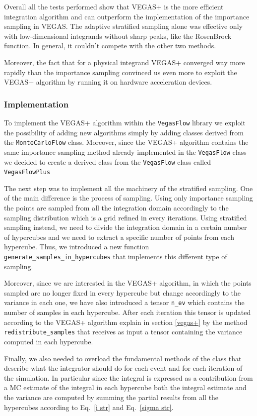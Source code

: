 \documentclass[../main/main.tex]{subfiles}
\begin{document}
Overall all the tests performed show that VEGAS+ is  the more efficient integration algorithm and can outperform the implementation of the importance sampling in VEGAS. The adaptive stratified sampling alone was effective only with low-dimensional integrands without sharp peaks, like the RosenBrock function. In general, it couldn't compete with the other two methods.

Moreover, the fact that for a physical integrand VEGAS+ converged way more rapidly than the importance sampling convinced us even more to exploit the VEGAS+ algorithm by running it on hardware acceleration devices.


\subsubsection{Implementation}
To implement the VEGAS+ algorithm within the \texttt{VegasFlow} library we exploit the possibility of adding new algorithms simply by
adding classes derived from the \texttt{MonteCarloFlow} class. Moreover, since the VEGAS+ algorithm contains the same importance sampling method already implemented in the \texttt{VegasFlow} class we decided to create a derived class from the \texttt{VegasFlow} class called \texttt{VegasFlowPlus}

The next step was to implement all the machinery of the stratified sampling. 
One of the main difference is the process of sampling. Using only importance sampling the points are sampled from all the integration domain accordingly to the sampling distribution which is a grid refined in every iterations. Using stratified sampling instead, we need to divide the integration domain in a certain number of hypercubes and we need to extract a specific number of points from each hypercube. 
Thus, we introduced a new function \texttt{generate\_samples\_in\_hypercubes} that implements this different type of sampling.

Moreover, since we are interested in the VEGAS+ algorithm, in which the points sampled are no longer fixed in every hypercube but change accordingly to the variance in each one, we have also introduced a tensor \texttt{n\_ev} which contains the number of samples in each hypercube. 
After each iteration this tensor is updated according to the VEGAS+ algorithm explain in section \ref{vegas+} by the method \texttt{redistribute\_samples} that receives as input a tensor containing the variance computed in each hypercube.

Finally, we also needed to overload the fundamental methods of the class that describe what the integrator should do for each event and for each iteration of the simulation. In particular since the integral is expressed as a contribution from a MC estimate of the integral in each hypercube both the integral estimate and the variance are computed by summing the partial results from all the hypercubes according to Eq.~\ref{i str} and Eq.~\ref{sigma str}.
\end{document}
